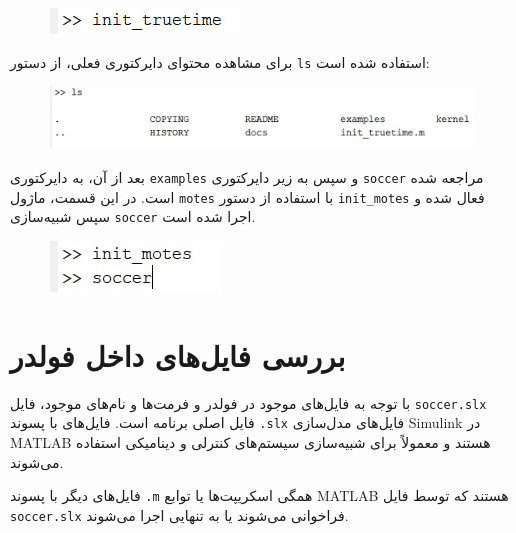 \begin{figure}[h]
	\centering
	\includegraphics{13.jpg}
	\label{fig:label4}
\end{figure}

برای مشاهده محتوای دایرکتوری فعلی، از دستور \texttt{ls} استفاده شده است:

\begin{figure}[h]
	\centering
	\includegraphics{14.jpg}
	\label{fig:label4}
\end{figure}

بعد از آن، به دایرکتوری \texttt{examples} و سپس به زیر دایرکتوری \texttt{soccer} مراجعه شده است. در این قسمت، ماژول \texttt{motes} با استفاده از دستور \texttt{init\_motes} فعال شده و سپس شبیه‌سازی \texttt{soccer} اجرا شده است.

\begin{figure}[H]
	\centering
	\includegraphics{15.jpg}
	\label{fig:label4}
\end{figure}

\newpage

\section*{بررسی فایل‌های داخل فولدر }

با توجه به فایل‌های موجود در فولدر و فرمت‌ها و نام‌های موجود، فایل \texttt{soccer.slx} فایل اصلی برنامه است. فایل‌های با پسوند \texttt{.slx} فایل‌های مدل‌سازی Simulink در MATLAB هستند و معمولاً برای شبیه‌سازی سیستم‌های کنترلی و دینامیکی استفاده می‌شوند.

فایل‌های دیگر با پسوند \texttt{.m} همگی اسکریپت‌ها یا توابع MATLAB هستند که توسط فایل \texttt{soccer.slx} فراخوانی می‌شوند یا به تنهایی اجرا می‌شوند.

